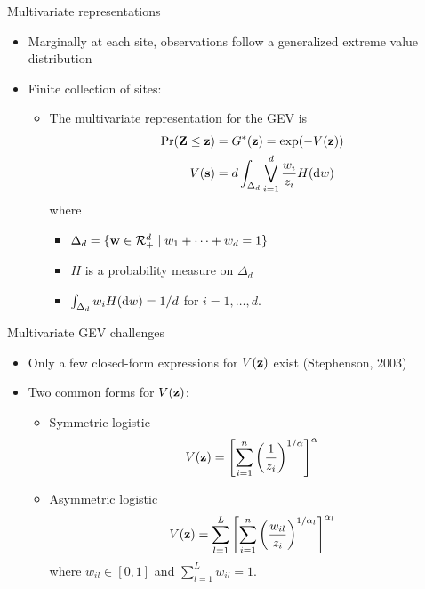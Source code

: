 \documentclass{beamer}
\begin{document}
\begin{frame}{Multivariate representations}
  \begin{itemize}
    \item Marginally at each site, observations follow a generalized extreme value distribution
    \item Finite collection of sites:
    \begin{itemize}
      \item The multivariate representation for the GEV is
      \begin{align*}
        \Pr(\mbox{\bf Z} \le \mbox{\bf z})  &= G^*(\mbox{\bf z}) = \exp(-V(\mbox{\bf z}))\\
                V(\mbox{\bf s})    &= d \int_{\Delta_d} \bigvee_{i = 1}^d \frac{w_i}{z_i} H(\text{d} w)
      \end{align*}
      where
      \begin{itemize}
        \item $\Delta_d = \{ \mbox{\bf w} \in {\cal R}^d_+ \mid w_1 + \cdots + w_d = 1\}$
        \item $H$ is a probability measure on $\Delta_d$
        \item $\int_{\Delta_d}w_i H(\text{d} w) = 1 / d$ for $i = 1, \ldots, d$.
      \end{itemize}
    \end{itemize}
  \end{itemize}
\end{frame}

\begin{frame}{Multivariate GEV challenges}
  \begin{itemize}
    \item Only a few closed-form expressions for $V(\mbox{\bf z})$ exist (Stephenson, 2003)
    \item Two common forms for $V(\mbox{\bf z})$:
    \begin{itemize}
      \item Symmetric logistic
      \begin{align*}
        V(\mbox{\bf z}) = \left[\sum_{i = 1}^n \left( \frac{ 1 }{ z_i } \right)^{1/\alpha}\right]^\alpha
      \end{align*}
      \item Asymmetric logistic
      \begin{align*}
        V(\mbox{\bf z}) = \sum_{l = 1}^L \left[\sum_{i = 1}^n \left(\frac{w_{il}}{z_i} \right)^{1 / \alpha_l} \right]^{\alpha_l}
      \end{align*}
      where $w_{il} \in [0, 1]$ and $\sum_{l = 1}^L w_{il} = 1$.
    \end{itemize}
  \end{itemize}
\end{frame}
\end{document}
